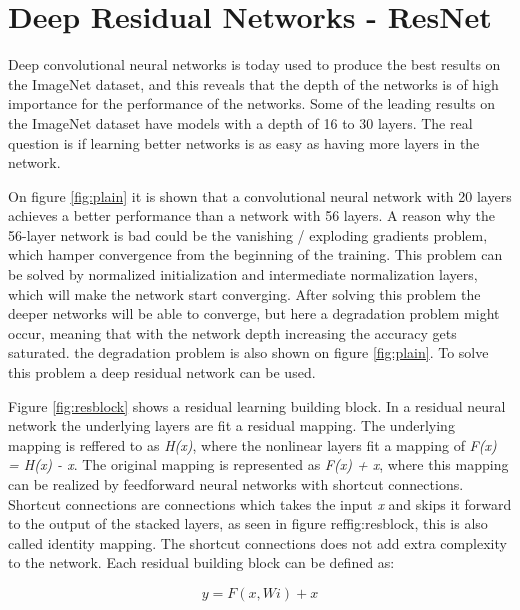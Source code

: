 \section{Deep Residual Networks - ResNet}

Deep convolutional neural networks is today used to produce the best results on the ImageNet dataset, and this reveals that the depth of the networks is of high importance for the performance of the networks\citep{RESNET}. Some of the leading results on the ImageNet dataset have models with a depth of 16 to 30 layers. The real question is if learning better networks is as easy as having more layers in the network.


On figure \ref{fig:plain} it is shown that a convolutional neural network with 20 layers achieves a better performance than a network with 56 layers. A reason why the 56-layer network is bad could be the vanishing / exploding gradients problem, which hamper convergence from the beginning of the training. This problem can be solved by normalized initialization and intermediate normalization layers, which will make the network start converging. After solving this problem the deeper networks will be able to converge, but here a degradation problem might occur, meaning that with the network depth increasing the accuracy gets saturated. the degradation problem is also shown on figure \ref{fig:plain}. To solve this problem a deep residual network can be used.


Figure \ref{fig:resblock} shows a residual learning building block. In a residual neural network the underlying layers are fit a residual mapping. The underlying mapping is reffered to as \emph{H(x)}, where the nonlinear layers fit a mapping of \emph{F(x) = H(x) - x}. The original mapping is represented as \emph{F(x) + x}, where this mapping can be realized by feedforward neural networks with shortcut connections. Shortcut connections are connections which takes the input \emph{x} and skips it forward to the output of the stacked layers, as seen in figure ref{fig:resblock}, this is also called identity mapping. The shortcut connections does not add extra complexity to the network. Each residual building block can be defined as:

\begin{equation} \label{eq:res}
y = F(x, {Wi}) + x
\end{equation} 

